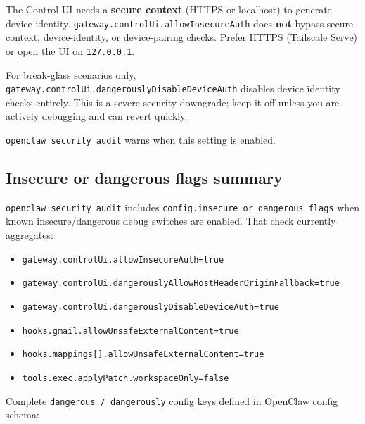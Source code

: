 The Control UI needs a \textbf{secure context} (HTTPS or localhost) to generate device
identity. \texttt{gateway.controlUi.allowInsecureAuth} does \textbf{not} bypass secure-context,
device-identity, or device-pairing checks. Prefer HTTPS (Tailscale Serve) or open
the UI on \texttt{127.0.0.1}.

For break-glass scenarios only, \texttt{gateway.controlUi.dangerouslyDisableDeviceAuth}
disables device identity checks entirely. This is a severe security downgrade;
keep it off unless you are actively debugging and can revert quickly.

\texttt{openclaw security audit} warns when this setting is enabled.

\subsection{Insecure or dangerous flags summary}


\texttt{openclaw security audit} includes \texttt{config.insecure\_or\_dangerous\_flags} when
known insecure/dangerous debug switches are enabled. That check currently
aggregates:

\begin{itemize}
  \item \texttt{gateway.controlUi.allowInsecureAuth=true}
  \item \texttt{gateway.controlUi.dangerouslyAllowHostHeaderOriginFallback=true}
  \item \texttt{gateway.controlUi.dangerouslyDisableDeviceAuth=true}
  \item \texttt{hooks.gmail.allowUnsafeExternalContent=true}
  \item \texttt{hooks.mappings[].allowUnsafeExternalContent=true}
  \item \texttt{tools.exec.applyPatch.workspaceOnly=false}
\end{itemize}


Complete \texttt{dangerous\textit{} / \texttt{dangerously}} config keys defined in OpenClaw config
schema:

